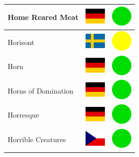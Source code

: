 \documentclass[12pt, a4paper, twoside]{report}
\begin{document}
\begin{center}
\begin{longtable}{|p{5cm}|p{2cm}|p{2cm}|}
 Home Reared Meat                                           & \includegraphics[width=1cm]{../img/flags/de} &   \includegraphics[width=1cm]{../likes/y} \\ \hline
 Horisont                                                   & \includegraphics[width=1cm]{../img/flags/se} &   \includegraphics[width=1cm]{../likes/m} \\ \hline
 Horn                                                       & \includegraphics[width=1cm]{../img/flags/de} &   \includegraphics[width=1cm]{../likes/y} \\ \hline
 Horns of Domination                                        & \includegraphics[width=1cm]{../img/flags/de} &   \includegraphics[width=1cm]{../likes/y} \\ \hline
 Horresque                                                  & \includegraphics[width=1cm]{../img/flags/de} &   \includegraphics[width=1cm]{../likes/y} \\ \hline
 Horrible Creatures                                         & \includegraphics[width=1cm]{../img/flags/cz} &   \includegraphics[width=1cm]{../likes/y} \\ \hline

\end{longtable}
\end{center}
\end{document}
